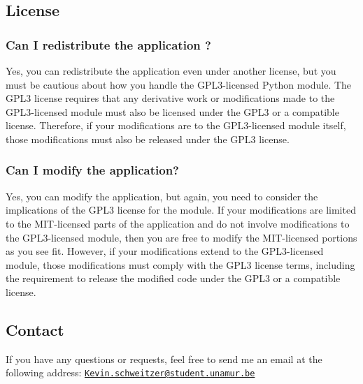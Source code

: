 \subsection{License}
\label{subsec:License}
\subsubsection{Can I redistribute the application ?}
Yes, you can redistribute the application even under another license, but you must be cautious about how you handle the GPL3-licensed Python module. The GPL3 license requires that any derivative work or modifications made to the GPL3-licensed module must also be licensed under the GPL3 or a compatible license. Therefore, if your modifications are to the GPL3-licensed module itself, those modifications must also be released under the GPL3 license.
\subsubsection{Can I modify the application?}
Yes, you can modify the application, but again, you need to consider the implications of the GPL3 license for the module. If your modifications are limited to the MIT-licensed parts of the application and do not involve modifications to the GPL3-licensed module, then you are free to modify the MIT-licensed portions as you see fit. However, if your modifications extend to the GPL3-licensed module, those modifications must comply with the GPL3 license terms, including the requirement to release the modified code under the GPL3 or a compatible license.
\subsection{Contact}
\label{sec:contact}
If you have any questions or requests, feel free to send me an email at the following address: \href{mailto:Kevin.schweitzer@student.unamur.be}{\nolinkurl{Kevin.schweitzer@student.unamur.be}}
